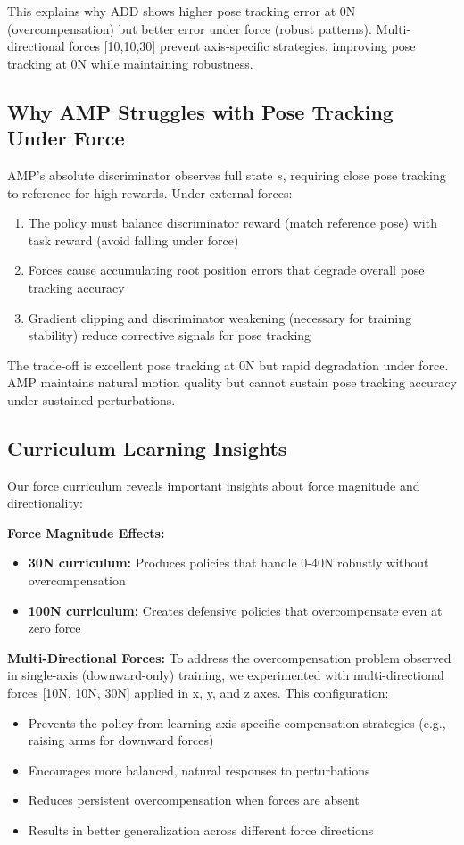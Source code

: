\documentclass{article}
\begin{document}
This explains why ADD shows higher pose tracking error at 0N (overcompensation) but better error under force (robust patterns). Multi-directional forces [10,10,30] prevent axis-specific strategies, improving pose tracking at 0N while maintaining robustness.

\subsection{Why AMP Struggles with Pose Tracking Under Force}

AMP's absolute discriminator observes full state $s$, requiring close pose tracking to reference for high rewards. Under external forces:

\begin{enumerate}
\item The policy must balance discriminator reward (match reference pose) with task reward (avoid falling under force)
\item Forces cause accumulating root position errors that degrade overall pose tracking accuracy
\item Gradient clipping and discriminator weakening (necessary for training stability) reduce corrective signals for pose tracking
\end{enumerate}

The trade-off is excellent pose tracking at 0N but rapid degradation under force. AMP maintains natural motion quality but cannot sustain pose tracking accuracy under sustained perturbations.

\subsection{Curriculum Learning Insights}

Our force curriculum reveals important insights about force magnitude and directionality:

\textbf{Force Magnitude Effects:}
\begin{itemize}
\item \textbf{30N curriculum:} Produces policies that handle 0-40N robustly without overcompensation
\item \textbf{100N curriculum:} Creates defensive policies that overcompensate even at zero force
\end{itemize}

\textbf{Multi-Directional Forces:} To address the overcompensation problem observed in single-axis (downward-only) training, we experimented with multi-directional forces [10N, 10N, 30N] applied in x, y, and z axes. This configuration:
\begin{itemize}
\item Prevents the policy from learning axis-specific compensation strategies (e.g., raising arms for downward forces)
\item Encourages more balanced, natural responses to perturbations
\item Reduces persistent overcompensation when forces are absent
\item Results in better generalization across different force directions
\end{itemize}
\end{document}
